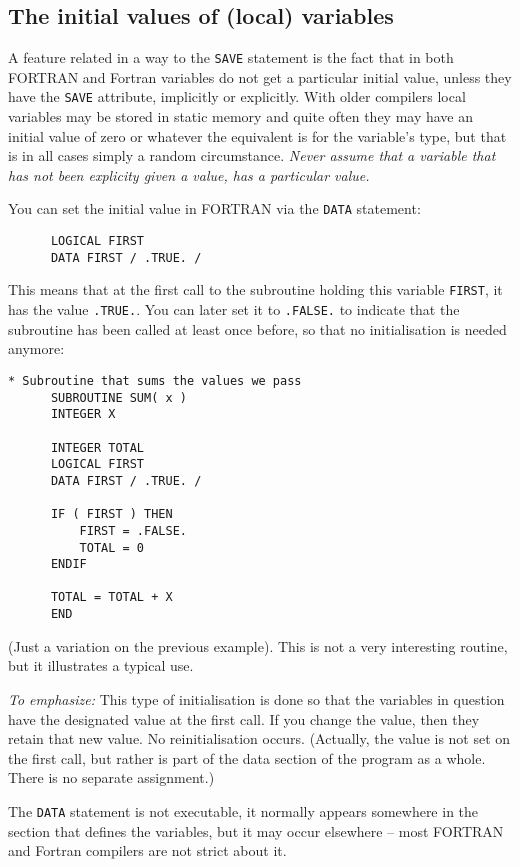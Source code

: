 \subsection{The initial values of (local) variables}
A feature related in a way to the \verb+SAVE+ statement is the fact that
in both FORTRAN and Fortran variables do not get a particular initial
value, unless they have the \verb+SAVE+ attribute, implicitly or explicitly.
With older compilers local variables may be stored in static memory and
quite often they may have an initial value of zero or whatever the
equivalent is for the variable's type, but that is in all cases simply
a random circumstance. \emph{Never assume that a variable that has not
been explicity given a value, has a particular value.}

You can set the initial value in FORTRAN via the \verb+DATA+ statement:
%
\begin{verbatim}
      LOGICAL FIRST
      DATA FIRST / .TRUE. /
\end{verbatim}

This means that at the first call to the subroutine holding this variable
\verb+FIRST+, it has the value \verb+.TRUE.+. You can later set it to
\verb+.FALSE.+ to indicate that the subroutine has been called at least once
before, so that no initialisation is needed anymore:
%
\begin{verbatim}
* Subroutine that sums the values we pass
      SUBROUTINE SUM( x )
      INTEGER X

      INTEGER TOTAL
      LOGICAL FIRST
      DATA FIRST / .TRUE. /

      IF ( FIRST ) THEN
          FIRST = .FALSE.
          TOTAL = 0
      ENDIF

      TOTAL = TOTAL + X
      END
\end{verbatim}
(Just a variation on the previous example). This is not a very interesting routine,
but it illustrates a typical use.

\emph{To emphasize:} This type of initialisation is done so that the variables
in question have the designated value at the first call. If you change
the value, then they retain that new value. No reinitialisation occurs.
(Actually, the value is not set on the first call, but rather is part
of the data section of the program as a whole. There is no separate
assignment.)

The \verb+DATA+ statement is not executable, it normally appears
somewhere in the section that defines the variables, but it may occur
elsewhere -- most FORTRAN and Fortran compilers are not strict about it.

